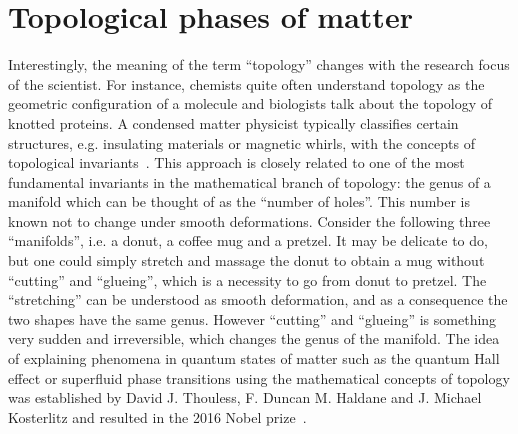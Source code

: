 %
%
\chapter{Topological phases of matter}
\label{ch:topological_phases_of_matter}
%
%
Interestingly, the meaning of the term ``topology'' changes with the research focus of the scientist.
For instance, chemists quite often understand topology as the geometric configuration of a molecule and biologists talk about the topology of knotted proteins.
A condensed matter physicist typically classifies certain structures, e.g. insulating materials or magnetic whirls, with the concepts of topological invariants~\cite{topocondmat}.
This approach is closely related to one of the most fundamental invariants in the mathematical branch of topology: the genus of a manifold which can be thought of as the ``number of holes''.
This number is known not to change under smooth deformations.
Consider the following three ``manifolds'', i.e. a donut, a coffee mug and a pretzel.
It may be delicate to do, but one could simply stretch and massage the donut to obtain a mug without ``cutting'' and ``glueing'', which is a necessity to go from donut to pretzel.
The ``stretching'' can be understood as smooth deformation, and as a consequence the two shapes have the same genus.
However ``cutting'' and ``glueing'' is something very sudden and irreversible, which changes the genus of the manifold.
The idea of explaining phenomena in quantum states of matter such as the quantum Hall effect or superfluid phase transitions using the mathematical concepts of topology was established by David J. Thouless, F. Duncan M. Haldane and J. Michael Kosterlitz and resulted in the 2016 Nobel prize~\cite{NP2016}.

